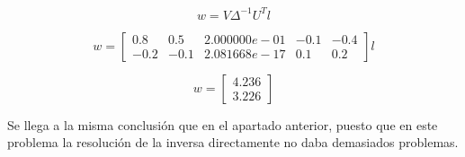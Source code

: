 \documentclass[a4paper]{article}
\begin{document}
\begin{enumerate}
{  \begin{equation*}
    w = V\Delta^{-1}U^T l
  \end{equation*}

  \begin{equation*}
    w =
    \begin{bmatrix}
      0.8 & 0.5 & 2.000000e-01 & -0.1 & -0.4 \\
      -0.2 & -0.1 & 2.081668e-17 & 0.1 & 0.2
    \end{bmatrix}
      l
  \end{equation*}

  \begin{equation*}
    w =
    \begin{bmatrix}
      4.236 \\
      3.226
    \end{bmatrix}
  \end{equation*}


  Se llega a la misma conclusión que en el apartado anterior, puesto que
  en este problema la resolución de la inversa directamente no daba
  demasiados problemas.

  }



\end{enumerate}
\end{document}
